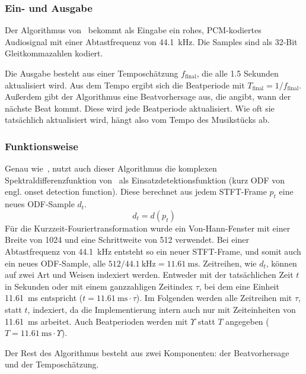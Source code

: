 {{		\subsubsection*{Ein- und Ausgabe}
		{
			Der Algorithmus von~\cite{2009_DaPlSt} bekommt als Eingabe ein rohes, PCM-kodiertes Audiosignal mit einer Abtastfrequenz von \SI{44.1}{\kilo\hertz}.
			Die Samples sind als 32-Bit Gleitkommazahlen kodiert.

			Die Ausgabe besteht aus einer Temposchätzung $f_\text{final}$,
				die alle \num{1.5} Sekunden aktualisiert wird.
			Aus dem Tempo ergibt sich die Beatperiode mit $T_\text{final} = 1 / f_\text{final}$.
			Au{\ss}erdem gibt der Algorithmus eine Beatvorhersage aus,
				die angibt,
				wann der nächste Beat kommt.
			Diese wird jede Beatperiode aktualisiert.
			Wie oft sie tatsächlich aktualisiert wird,
				hängt also vom Tempo des Musikstücks ab.
		}

		\subsubsection*{Funktionsweise}
		{
			Genau wie~\cite{2011_PlRoSt},
				nutzt auch dieser Algorithmus die komplexen Spektraldifferenzfunktion von~\cite{2004_BeDaDuSa}
				als Einsatzdetektionsfunktion (kurz ODF von engl. onset detection function).
			Diese berechnet aus jedem STFT-Frame $p_t$ eine neues ODF-Sample $d_t$.
			\begin{equation}
				d_t = d(p_t)
			\end{equation}
			Für die Kurzzeit-Fouriertransformation wurde ein Von-Hann-Fenster mit einer Breite von \num{1024} und eine Schrittweite von \num{512} verwendet.
			Bei einer Abtastfrequenz von \SI{44.1}{\kilo\hertz} entsteht so ein neuer STFT-Frame,
				und somit auch ein neues ODF-Sample,
				alle $512 / \SI{44.1}{\kilo\hertz} = \SI{11.61}{\milli\second}$.
			Zeitreihen, wie $d_t$, können auf zwei Art und Weisen indexiert werden.
			Entweder mit der tatsächlichen Zeit $t$ in Sekunden
				oder mit einem ganzzahligen Zeitindex $\tau$,
				bei dem eine Einheit \SI{11.61}{\milli\second} entspricht
				($t = \SI{11.61}{\milli\second} \cdot \tau$).
			Im Folgenden werden alle Zeitreihen mit $\tau$, statt $t$, indexiert,
				da die Implementierung intern auch nur mit Zeiteinheiten von \SI{11.61}{\milli\second} arbeitet.
			Auch Beatperioden werden mit $\Upsilon$ statt $T$ angegeben ($T = \SI{11.61}{\milli\second} \cdot \Upsilon$).


			Der Rest des Algorithmus besteht aus zwei Komponenten:
				der Beatvorhersage und der Temposchätzung.

}}}
